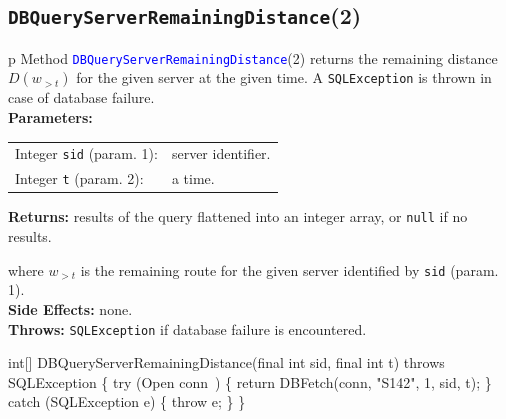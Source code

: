 \subsection{\texttt{DBQueryServerRemainingDistance}(2)}
\begin{tabular}{p{\textwidth}}
\toprule
{}
Method \textcolor{blue}{{\tt{}\protect{}DBQueryServerRemainingDistance}}(2) returns the
remaining distance $D(w_{>t})$ for the given server at the given time.
A {\tt{}SQLException} is thrown in case of database failure.\\
\midrule
\textbf{Parameters:} \\
\begin{tabular}{lp{116mm}}
Integer {\tt{}sid} (param. 1):&server identifier.\\
Integer {\tt{}t} (param. 2):&a time.\\
\end{tabular}
\textbf{Returns:} results of the query flattened into an integer array,
or {\tt{}null} if no results.


where $w_{>t}$ is the remaining route for the given server identified by {\tt{}sid} (param. 1).\\
\textbf{Side Effects:} none.\\
\textbf{Throws:} {\tt{}SQLException} if database failure is encountered.\\
\bottomrule
\end{tabular}
\nwenddocs{}\endmoddef{}
int[] DBQueryServerRemainingDistance(final int sid, final int t)
throws SQLException \{
  try (\LA{}Open \code{}conn\edoc{}~{\nwtagstyle{}}\RA{}) \{
    return DBFetch(conn, "S142", 1, sid, t);
  \} catch (SQLException e) \{
    throw e;
  \}
\}
\eatline

